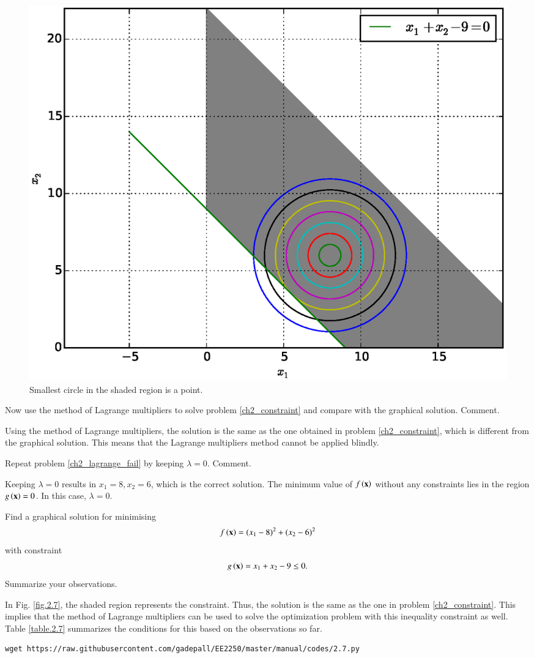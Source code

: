 \documentclass[journal,12pt,twocolumn]{IEEEtran}
\begin{document}
%
\begin{figure}[!ht]
\centering
\includegraphics[width=\columnwidth]{./figs/2.4.eps}
\caption{ Smallest circle in the shaded region is a point.}
\label{fig.2.4}	
\end{figure}
%
\begin{problem}
\label{ch2_lagrange_fail}
Now use the method of Lagrange multipliers to solve  problem \ref{ch2_constraint} and compare with the graphical solution.  Comment.
\end{problem}
%
\solution Using the method of Lagrange multipliers, the solution is the same as the one obtained in  problem \ref{ch2_constraint}, which is different from the graphical solution.  This means that the Lagrange multipliers method cannot be applied blindly.
\begin{problem}
Repeat problem \ref{ch2_lagrange_fail} by keeping 
 $\lambda=0$.   Comment.
\end{problem}
\solution Keeping $\lambda = 0$ results in $x_1 = 8, x_2 = 6$, which is the correct solution.  The minimum value of $f\left(\mathbf{x}\right)$ without any constraints lies in the region $g\left(\mathbf{x}\right) = 0$.  In this case, $\lambda = 0$.  
%
%
\begin{problem}
\label{ch2_constraint_border}
Find a graphical solution for minimising
\begin{align}
f\left(\mathbf{x}\right) = (x_1-8)^2 + (x_2-6)^2
\end{align}
with constraint
\begin{align}
g\left(\mathbf{x}\right) = x_1 + x_2 - 9 \leq 0.
\end{align}
Summarize your observations.
\end{problem}
%
\solution In Fig. \ref{fig.2.7}, the shaded region represents the constraint.  Thus, the solution is the same as the one in problem \ref{ch2_constraint}. This implies that the method of
Lagrange multipliers can be used to solve the optimization problem with this inequality constraint as well.  Table \ref{table.2.7} summarizes the conditions for this based on the observations so far.
\begin{lstlisting}
wget https://raw.githubusercontent.com/gadepall/EE2250/master/manual/codes/2.7.py
\end{lstlisting}
\end{document}
